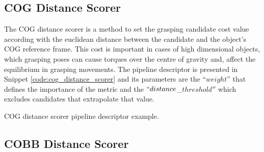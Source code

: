 \subsection{\acl{COG} Distance Scorer}
\label{cap4:modular_grasping_architecture:sec:grasp_selection:subsec:cog_distance}

The \ac{COG} distance scorer is a method to set the grasping candidate cost value according with the euclidean distance between the candidate and the object's \ac{COG} reference frame. This cost is important in cases of high dimensional objects, which grasping poses can cause torques over the centre of gravity and, affect the equilibrium in grasping movements. The pipeline descriptor is presented in Snippet \ref{code:cog_distance_scorer} and its parameters are the ``$weight$'' that defines the importance of the metric and the $``distance$\_$threshold''$ which excludes candidates that extrapolate that value.



\begin{snippet}[h!]
\centering
{}
\caption{\ac{COG} distance scorer pipeline descriptor example.}
\label{code:cog_distance_scorer}
\end{snippet}

\subsection{\acl{COBB} Distance Scorer}
\label{cap4:modular_grasping_architecture:sec:grasp_selection:subsec:cobb_distance}

